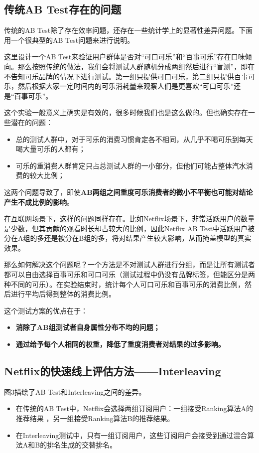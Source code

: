 \documentclass[12pt]{article}
\begin{document}
\subsection{传统AB Test存在的问题}
传统的AB Test除了存在效率问题，还存在一些统计学上的显著性差异问题。下面用一个很典型的AB Test问题来进行说明。

这里设计一个AB Test来验证用户群体是否对“可口可乐”和“百事可乐”存在口味倾向。那么按照传统的做法，我们会将测试人群随机分成两组然后进行“盲测”，即在不告知可乐品牌的情况下进行测试。第一组只提供可口可乐，第二组只提供百事可乐，然后根据大家一定时间内的可乐消耗量来观察人们是更喜欢“可口可乐”还是“百事可乐”。

这个实验一般意义上确实是有效的，很多时候我们也是这么做的。但也确实存在一些潜在的问题：

\begin{itemize}
\setlength{\itemsep}{0pt}
\setlength{\parsep}{0pt}
\setlength{\parskip}{0pt}
    \item 总的测试人群中，对于可乐的消费习惯肯定各不相同，从几乎不喝可乐到每天喝大量可乐的人都有；
    \item 可乐的重消费人群肯定只占总测试人群的一小部分，但他们可能占整体汽水消费的较大比例；
\end{itemize}

这两个问题导致了，即使\textbf{AB两组之间重度可乐消费者的微小不平衡也可能对结论产生不成比例的影响}。

在互联网场景下，这样的问题同样存在。比如Netflix场景下，非常活跃用户的数量是少数，但其贡献的观看时长却占较大的比例，因此Netflix AB Test中活跃用户被分在A组的多还是被分在B组的多，将对结果产生较大影响，从而掩盖模型的真实效果。

那么如何解决这个问题呢？一个方法是不对测试人群进行分组，而是让所有测试者都可以自由选择百事可乐和可口可乐（测试过程中仍没有品牌标签，但能区分是两种不同的可乐）。在实验结束时，统计每个人可口可乐和百事可乐的消费比例，然后进行平均后得到整体的消费比例。

这个测试方案的优点在于：
\begin{itemize}
\setlength{\itemsep}{0pt}
\setlength{\parsep}{0pt}
\setlength{\parskip}{0pt}
    \item \textbf{消除了AB组测试者自身属性分布不均的问题；}
    \item \textbf{通过给予每个人相同的权重，降低了重度消费者对结果的过多影响。}
\end{itemize}

\subsection{Netflix的快速线上评估方法——Interleaving}
图3描绘了AB Test和Interleaving之间的差异。
\begin{itemize}
\setlength{\itemsep}{0pt}
\setlength{\parsep}{0pt}
\setlength{\parskip}{0pt}
    \item 在传统的AB Test中，Netflix会选择两组订阅用户：一组接受Ranking算法A的推荐结果 ，另一组接受Ranking算法B的推荐结果。
    \item 在Interleaving测试中，只有一组订阅用户，这些订阅用户会接受到通过混合算法A和B的排名生成的交替排名。
\end{itemize}
\end{document}
